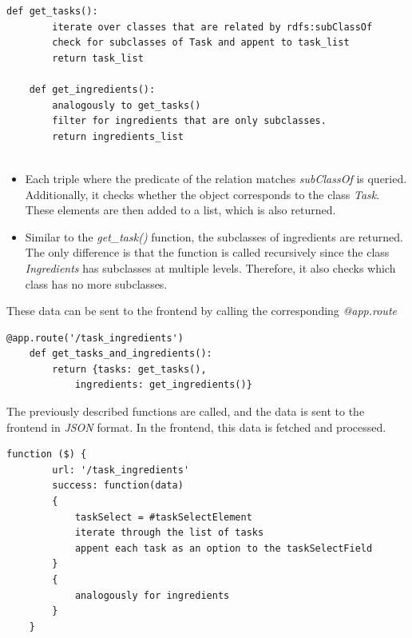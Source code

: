 \begin{lstlisting}[caption={Task and ingredient extraction},captionpos=b]
   def get_tasks():
        iterate over classes that are related by rdfs:subClassOf
        check for subclasses of Task and appent to task_list
        return task_list

    def get_ingredients():
        analogously to get_tasks()
        filter for ingredients that are only subclasses.
        return ingredients_list


\end{lstlisting}


\begin{itemize}
    \item Each triple where the predicate of the relation matches \textit{subClassOf} is queried. Additionally, it checks whether the object corresponds to the class \textit{Task}. These elements are then added to a list, which is also returned.
    \item Similar to the \textit{get\_task()} function, the subclasses of ingredients are returned. The only difference is that the function is called recursively since the class \textit{Ingredients} has subclasses at multiple levels. Therefore, it also checks which class has no more subclasses.
\end{itemize}

These data can be sent to the frontend by calling the corresponding \textit{@app.route}

\begin{lstlisting}[caption={Sending task and ingredients list to the frontend},captionpos=b]
    @app.route('/task_ingredients')
    def get_tasks_and_ingredients():
        return {tasks: get_tasks(), 
            ingredients: get_ingredients()} 

\end{lstlisting}

The previously described functions are called, and the data is sent to the frontend in \textit{JSON} format. In the frontend, this data is fetched and processed.

\begin{lstlisting}[caption={Fetch and populate select fields},captionpos=b]
    function ($) {
        url: '/task_ingredients'
        success: function(data)
        {
            taskSelect = #taskSelectElement
            iterate through the list of tasks
            appent each task as an option to the taskSelectField
        }
        {
            analogously for ingredients
        }
    }

\end{lstlisting}




